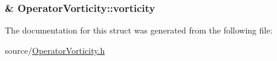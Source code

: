 \subsubsection[{vorticity}]{\& Operator\+Vorticity\+::vorticity}\label{struct_operator_vorticity_a8612e8747d5eb6a0ab2f8064e9ba1ba7}


The documentation for this struct was generated from the following file\+:\begin{DoxyCompactItemize}
\item 
source/\hyperlink{_operator_vorticity_8h}{Operator\+Vorticity.\+h}\end{DoxyCompactItemize}
